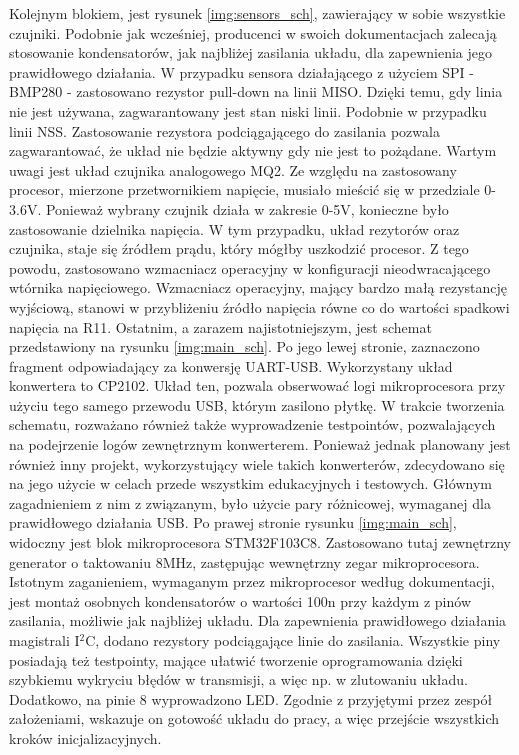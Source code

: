 Kolejnym blokiem, jest rysunek \ref{img:sensors_sch}, zawierający w sobie wszystkie czujniki. Podobnie jak wcześniej, producenci w swoich dokumentacjach zalecają stosowanie kondensatorów, jak najbliżej zasilania układu, dla zapewnienia jego prawidłowego działania. W przypadku sensora działającego z użyciem SPI - BMP280 - zastosowano rezystor pull-down na linii MISO\cite{bmp_datasheet}. Dzięki temu, gdy linia nie jest używana, zagwarantowany jest stan niski linii. Podobnie w przypadku linii NSS. Zastosowanie rezystora podciągającego do zasilania pozwala zagwarantować, że układ nie będzie aktywny gdy nie jest to pożądane.
\newline
Wartym uwagi jest układ czujnika analogowego MQ2. Ze względu na zastosowany procesor, mierzone przetwornikiem napięcie, musiało mieścić się w przedziale 0-3.6V. Ponieważ wybrany czujnik działa w zakresie 0-5V, konieczne było zastosowanie dzielnika napięcia. W tym przypadku, układ rezytorów oraz czujnika, staje się źródłem prądu, który mógłby uszkodzić procesor. Z tego powodu, zastosowano wzmacniacz operacyjny w konfiguracji nieodwracającego wtórnika napięciowego. Wzmacniacz operacyjny, mający bardzo małą rezystancję wyjściową, stanowi w przybliżeniu źródło napięcia równe co do wartości spadkowi napięcia na R11.
\newline
\newline
Ostatnim, a zarazem najistotniejszym, jest schemat przedstawiony na rysunku \ref{img:main_sch}. Po jego lewej stronie, zaznaczono fragment odpowiadający za konwersję UART-USB. Wykorzystany układ konwertera to CP2102\cite{cp2102_datasheet}. Układ ten, pozwala obserwować logi mikroprocesora przy użyciu tego samego przewodu USB, którym zasilono płytkę. W trakcie tworzenia schematu, rozważano również także wyprowadzenie testpointów, pozwalających na podejrzenie logów zewnętrznym konwerterem. Ponieważ jednak planowany jest również inny projekt, wykorzystujący wiele takich konwerterów, zdecydowano się na jego użycie w celach przede wszystkim edukacyjnych i testowych. Głównym zagadnieniem z nim z związanym, było użycie pary różnicowej, wymaganej dla prawidłowego działania USB.
\newline
Po prawej stronie rysunku \ref{img:main_sch}, widoczny jest blok mikroprocesora STM32F103C8. Zastosowano tutaj zewnętrzny generator o taktowaniu 8MHz, zastępując wewnętrzny zegar mikroprocesora. Istotnym zaganieniem, wymaganym przez mikroprocesor według dokumentacji, jest montaż osobnych kondensatorów o wartości 100n przy każdym z pinów zasilania, możliwie jak najbliżej układu. Dla zapewnienia prawidłowego działania magistrali I$^2$C, dodano rezystory podciągające linie do zasilania. Wszystkie piny posiadają też testpointy, mające ułatwić tworzenie oprogramowania dzięki szybkiemu wykryciu błędów w transmisji, a więc np. w zlutowaniu układu. Dodatkowo, na pinie 8 wyprowadzono LED. Zgodnie z przyjętymi przez zespół założeniami, wskazuje on gotowość układu do pracy, a więc przejście wszystkich kroków inicjalizacyjnych.
